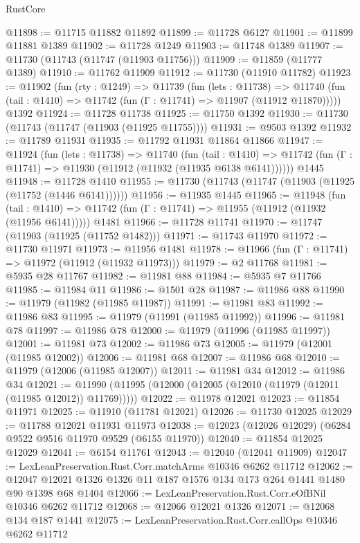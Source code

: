 \begin{lexlean}{RustCore}
\begin{coremodule}
@11898 := @11715 @11882 @11892
@11899 := @11728 @6127
@11901 := @11899 @11881 @1389
@11902 := @11728 @1249
@11903 := @11748 @1389
@11907 := @11730 (@11743 (@11747 (@11903 @11756)))
@11909 := @11859 (@11777 @1389)
@11910 := @11762 @11909
@11912 := @11730 (@11910 @11782)
@11923 := @11902
    (fun (rty : @1249) =>
    @11739
      (fun (lets : @11738) =>
      @11740 (fun (tail : @1410) => @11742 (fun (Γ : @11741) => @11907 (@11912 @11870)))))
    @1392
@11924 := @11728 @11738
@11925 := @11750 @1392
@11930 := @11730 (@11743 (@11747 (@11903 (@11925 @11755))))
@11931 := @9503 @1392
@11932 := @11789 @11931
@11935 := @11792 @11931 @11864 @11866
@11947 := @11924
    (fun (lets : @11738) =>
    @11740
      (fun (tail : @1410) =>
      @11742 (fun (Γ : @11741) => @11930 (@11912 (@11932 (@11935 @6138 @6141))))))
    @1445
@11948 := @11728 @1410
@11955 := @11730 (@11743 (@11747 (@11903 (@11925 (@11752 (@1446 @6141))))))
@11956 := @11935 @1445
@11965 := @11948
    (fun (tail : @1410) => @11742 (fun (Γ : @11741) => @11955 (@11912 (@11932 (@11956 @6141)))))
    @1481
@11966 := @11728 @11741
@11970 := @11747 (@11903 (@11925 (@11752 @1482)))
@11971 := @11743 @11970
@11972 := @11730 @11971
@11973 := @11956 @1481
@11978 := @11966 (fun (Γ : @11741) => @11972 (@11912 (@11932 @11973)))
@11979 := @2 @11768
@11981 := @5935 @28 @11767
@11982 := @11981 @88
@11984 := @5935 @7 @11766
@11985 := @11984 @11
@11986 := @1501 @28
@11987 := @11986 @88
@11990 := @11979 (@11982 (@11985 @11987))
@11991 := @11981 @83
@11992 := @11986 @83
@11995 := @11979 (@11991 (@11985 @11992))
@11996 := @11981 @78
@11997 := @11986 @78
@12000 := @11979 (@11996 (@11985 @11997))
@12001 := @11981 @73
@12002 := @11986 @73
@12005 := @11979 (@12001 (@11985 @12002))
@12006 := @11981 @68
@12007 := @11986 @68
@12010 := @11979 (@12006 (@11985 @12007))
@12011 := @11981 @34
@12012 := @11986 @34
@12021 := @11990 (@11995 (@12000 (@12005 (@12010 (@11979 (@12011 (@11985 @12012)) @11769)))))
@12022 := @11978 @12021
@12023 := @11854 @11971
@12025 := @11910 (@11781 @12021)
@12026 := @11730 @12025
@12029 := @11788 @12021 @11931 @11973
@12038 := @12023 (@12026 @12029) (@6284 @9522 @9516 @11970 @9529 (@6155 @11970))
@12040 := @11854 @12025 @12029
@12041 := @6154 @11761
@12043 := @12040 (@12041 @11909)
@12047 := LexLeanPreservation.Rust.Corr.matchArms @10346 @6262 @11712
@12062 := @12047 @12021 @1326 @1326 @11 @187 @1576 @134 @173 @264 @1441 @1480 @90 @1398 @68 @1404
@12066 := LexLeanPreservation.Rust.Corr.eOfBNil @10346 @6262 @11712
@12068 := @12066 @12021 @1326
@12071 := @12068 @134 @187 @1441
@12075 := LexLeanPreservation.Rust.Corr.callOps @10346 @6262 @11712

\end{coremodule}
\end{lexlean}
